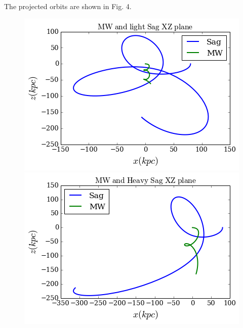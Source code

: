 The projected orbits are shown in Fig. 4.

\begin{figure}[H]
\centering
\includegraphics[scale=0.7]{MW_lsag_XZ.png}
\includegraphics[scale=0.7]{MW_hsag_XZ.png}
\caption{}
\end{figure}
